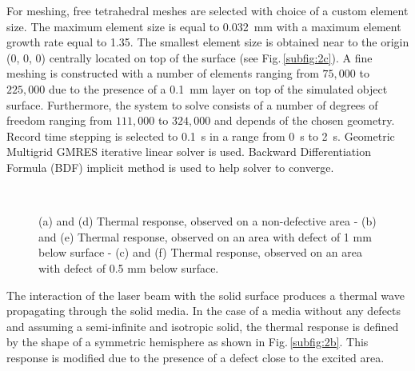 For meshing, free tetrahedral meshes are selected with choice of a custom element size. The maximum element size is equal to \SI{0.032}{\milli \metre} with a maximum element growth rate equal to 1.35. The smallest element size is obtained near to the origin (0, 0, 0) centrally located on top of the surface (see Fig.\,\ref{subfig:2c}). A fine meshing is constructed with a number of elements ranging from $75,000$ to $225,000$ due to the presence of a \SI{0.1}{\milli \metre} layer on top of the simulated object surface. Furthermore, the system to solve consists of a number of degrees of freedom ranging from $111,000$ to $324,000$ and depends of the chosen geometry. Record time stepping is selected to \SI{0.1}{\second} in a range from \SI{0}{\second} to \SI{2}{\second}. Geometric Multigrid GMRES iterative linear solver is used. Backward Differentiation Formula (BDF) implicit method is used to help solver to converge.

  \begin{figure}
  \centering
  \hspace*{\fill}
   \hfill
	\hspace*{\fill} \\ \hspace*{\fill}
   \hfill
  \hspace*{\fill}
  \caption{(a) and (d) Thermal response, observed on a non-defective area - (b) and (e) 
	Thermal response, observed on an area with defect of 1 mm below surface - (c) and (f) 
	Thermal response, 
	observed on an area with defect of 0.5 mm below surface.}
  \label{fig:3}
\end{figure}


The interaction of the laser beam with the solid surface produces a thermal wave propagating through the solid media. In the case of a media without any defects and assuming a semi-infinite and isotropic solid, the thermal response is defined by the shape of a symmetric hemisphere\cite{Li2011} as shown in Fig.\,\ref{subfig:2b}. This response is modified due to the presence of a defect close to the excited area.

